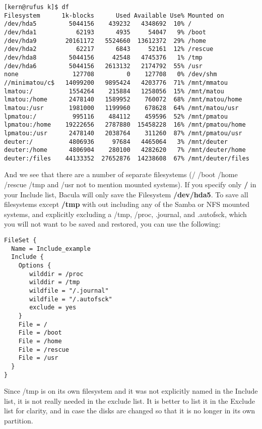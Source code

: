 \footnotesize
\begin{verbatim}
[kern@rufus k]$ df
Filesystem      1k-blocks      Used Available Use% Mounted on
/dev/hda5         5044156    439232   4348692  10% /
/dev/hda1           62193      4935     54047   9% /boot
/dev/hda9        20161172   5524660  13612372  29% /home
/dev/hda2           62217      6843     52161  12% /rescue
/dev/hda8         5044156     42548   4745376   1% /tmp
/dev/hda6         5044156   2613132   2174792  55% /usr
none               127708         0    127708   0% /dev/shm
//minimatou/c$   14099200   9895424   4203776  71% /mnt/mmatou
lmatou:/          1554264    215884   1258056  15% /mnt/matou
lmatou:/home      2478140   1589952    760072  68% /mnt/matou/home
lmatou:/usr       1981000   1199960    678628  64% /mnt/matou/usr
lpmatou:/          995116    484112    459596  52% /mnt/pmatou
lpmatou:/home    19222656   2787880  15458228  16% /mnt/pmatou/home
lpmatou:/usr      2478140   2038764    311260  87% /mnt/pmatou/usr
deuter:/          4806936     97684   4465064   3% /mnt/deuter
deuter:/home      4806904    280100   4282620   7% /mnt/deuter/home
deuter:/files    44133352  27652876  14238608  67% /mnt/deuter/files
\end{verbatim}
\normalsize

And we see that there are a number of separate filesystems (/ /boot
/home /rescue /tmp and /usr not to mention mounted systems).
If you specify only {\bf /} in your Include list, Bacula will only save the
Filesystem {\bf /dev/hda5}. To save all filesystems except {\bf /tmp} with
out including any of the Samba or NFS mounted systems, and explicitly
excluding a /tmp, /proc, .journal, and .autofsck, which you will not want to
be saved and restored, you can use the following: 

\footnotesize
\begin{verbatim}
FileSet {
  Name = Include_example
  Include {
    Options {
       wilddir = /proc
       wilddir = /tmp
       wildfile = "/.journal"
       wildfile = "/.autofsck"
       exclude = yes
    }
    File = /
    File = /boot
    File = /home
    File = /rescue
    File = /usr
  }
}
\end{verbatim}
\normalsize

Since /tmp is on its own filesystem and it was not explicitly named in the
Include list, it is not really needed in the exclude list. It is better to
list it in the Exclude list for clarity, and in case the disks are changed so
that it is no longer in its own partition. 

